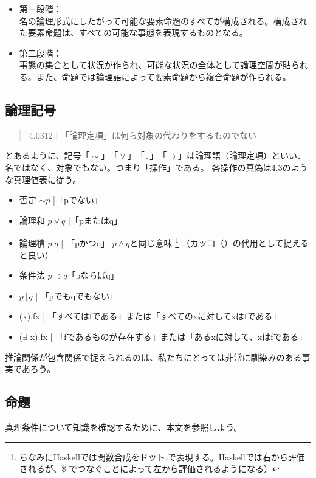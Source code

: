 \documentclass[11pt,a4paper,onecolumn,article]{jarticle}
\newcounter{ct}               %
\begin{document}
{\begin{itemize}
\item 第一段階：\\ 名の論理形式にしたがって可能な要素命題のすべてが構成される。構成された要素命題は、すべての可能な事態を表現するものとなる。
\item 第二段階：\\ 事態の集合として状況が作られ、可能な状況の全体として論理空間が貼られる。また、命題では論理語によって要素命題から複合命題が作られる。

\end{itemize}


\subsection{論理記号}
\begin{quote}
  4.0312 | 「論理定項」は何ら対象の代わりをするものでない
\end{quote}
 とあるように、記号$「\sim」「\vee」 「\, . \,」 「\supset」$は論理語（論理定項）といい、名ではなく、対象でもない。つまり「操作」である。
各操作の真偽は4.3のような真理値表に従う。

\begin{itemize}
  \item 否定 $\sim p$ |「pでない」
  \item 論理和 $p\vee q$ |「pまたはq」
  \item 論理積 $p.q$ | 「pかつq」 $p \wedge q$と同じ意味 \footnote{ちなみにHaskellでは関数合成をドット$.$で表現する。Haskellでは右から評価されるが、\$ でつなぐことによって左から評価されるようになる）} （カッコ（）の代用として捉えると良い）
  \item 条件法 $p \supset q$「pならばq」
  \item $p \, | \, q$ | 「pでもqでもない」
  \item (x).fx |  「すべてはfである」または「すべてのxに対してxはfである」
  \item ($\exists$ x).fx | 「fであるものが存在する」または「あるxに対して、xはfである」
\end{itemize}

推論関係が包含関係で捉えられるのは、私たちにとっては非常に馴染みのある事実であろう。


\subsection{命題}

真理条件について知識を確認するために、本文を参照しよう。

}
\end{document}
